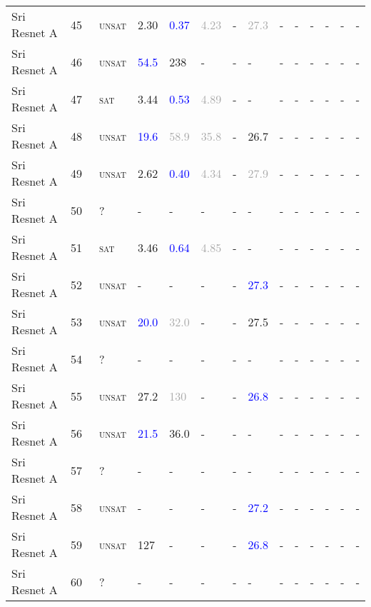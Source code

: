 \begin{center}
{\begin{longtable}{@{}llllllllllllll@{}}
Sri Resnet A & 45 & ~\textsc{unsat} & \textcolor{second}{2.30} & \textcolor{blue}{0.37} & \textcolor{darkgray}{4.23} & - & \textcolor{darkgray}{27.3} & - & - & - & - & - & - \\
Sri Resnet A & 46 & ~\textsc{unsat} & \textcolor{blue}{54.5} & \textcolor{second}{238} & - & - & - & - & - & - & - & - & - \\
Sri Resnet A & 47 & ~\textsc{sat} & \textcolor{second}{3.44} & \textcolor{blue}{0.53} & \textcolor{darkgray}{4.89} & - & - & - & - & - & - & - & - \\
Sri Resnet A & 48 & ~\textsc{unsat} & \textcolor{blue}{19.6} & \textcolor{darkgray}{58.9} & \textcolor{darkgray}{35.8} & - & \textcolor{second}{26.7} & - & - & - & - & - & - \\
Sri Resnet A & 49 & ~\textsc{unsat} & \textcolor{second}{2.62} & \textcolor{blue}{0.40} & \textcolor{darkgray}{4.34} & - & \textcolor{darkgray}{27.9} & - & - & - & - & - & - \\
Sri Resnet A & 50 & ~? & - & - & - & - & - & - & - & - & - & - & - \\
Sri Resnet A & 51 & ~\textsc{sat} & \textcolor{second}{3.46} & \textcolor{blue}{0.64} & \textcolor{darkgray}{4.85} & - & - & - & - & - & - & - & - \\
Sri Resnet A & 52 & ~\textsc{unsat} & - & - & - & - & \textcolor{blue}{27.3} & - & - & - & - & - & - \\
Sri Resnet A & 53 & ~\textsc{unsat} & \textcolor{blue}{20.0} & \textcolor{darkgray}{32.0} & - & - & \textcolor{second}{27.5} & - & - & - & - & - & - \\
Sri Resnet A & 54 & ~? & - & - & - & - & - & - & - & - & - & - & - \\
Sri Resnet A & 55 & ~\textsc{unsat} & \textcolor{second}{27.2} & \textcolor{darkgray}{130} & - & - & \textcolor{blue}{26.8} & - & - & - & - & - & - \\
Sri Resnet A & 56 & ~\textsc{unsat} & \textcolor{blue}{21.5} & \textcolor{second}{36.0} & - & - & - & - & - & - & - & - & - \\
Sri Resnet A & 57 & ~? & - & - & - & - & - & - & - & - & - & - & - \\
Sri Resnet A & 58 & ~\textsc{unsat} & - & - & - & - & \textcolor{blue}{27.2} & - & - & - & - & - & - \\
Sri Resnet A & 59 & ~\textsc{unsat} & \textcolor{second}{127} & - & - & - & \textcolor{blue}{26.8} & - & - & - & - & - & - \\
Sri Resnet A & 60 & ~? & - & - & - & - & - & - & - & - & - & - & - \\

\end{longtable}}
\end{center}
